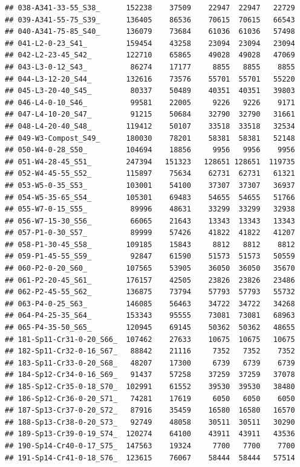 \documentclass[]{article}
\begin{document}
\begin{verbatim}
## 038-A341-33-55_S38_      152238    37509    22947  22947   22729
## 039-A341-55-75_S39_      136405    86536    70615  70615   66543
## 040-A341-75-85_S40_      136079    73684    61036  61036   57498
## 041-L2-0-23_S41_         159454    43258    23094  23094   23094
## 042-L2-23-45_S42_        122710    65865    49028  49028   47069
## 043-L3-0-12_S43_          86274    17177     8855   8855    8855
## 044-L3-12-20_S44_        132616    73576    55701  55701   55220
## 045-L3-20-40_S45_         80337    50489    40351  40351   39803
## 046-L4-0-10_S46_          99581    22005     9226   9226    9171
## 047-L4-10-20_S47_         91215    50684    32790  32790   31661
## 048-L4-20-40_S48_        119412    50107    33518  33518   32534
## 049-W3-Compost_S49_      180030    78201    58381  58381   52148
## 050-W4-0-28_S50_         104694    18856     9956   9956    9956
## 051-W4-28-45_S51_        247394   151323   128651 128651  119735
## 052-W4-45-55_S52_        115897    75634    62731  62731   61321
## 053-W5-0-35_S53_         103001    54100    37307  37307   36937
## 054-W5-35-65_S54_        105301    69483    54655  54655   51766
## 055-W7-0-15_S55_          89996    48631    33299  33299   32938
## 056-W7-15-30_S56_         66065    21643    13343  13343   13343
## 057-P1-0-30_S57_          89999    57426    41822  41822   41207
## 058-P1-30-45_S58_        109185    15843     8812   8812    8812
## 059-P1-45-55_S59_         92847    61590    51573  51573   50559
## 060-P2-0-20_S60_         107565    53905    36050  36050   35670
## 061-P2-20-45_S61_        176157    42505    23826  23826   23486
## 062-P2-45-55_S62_        136875    73794    57793  57793   55732
## 063-P4-0-25_S63_         146085    56463    34722  34722   34268
## 064-P4-25-35_S64_        153343    95555    73081  73081   68963
## 065-P4-35-50_S65_        120945    69145    50362  50362   48655
## 181-Sp11-Cr31-0-20_S66_  107462    27633    10675  10675   10675
## 182-Sp11-Cr32-0-16_S67_   88842    21116     7352   7352    7352
## 183-Sp11-Cr33-0-20_S68_   48207    17300     6739   6739    6739
## 184-Sp12-Cr34-0-16_S69_   91437    57258    37259  37259   37078
## 185-Sp12-Cr35-0-18_S70_  102991    61552    39530  39530   38480
## 186-Sp12-Cr36-0-20_S71_   74281    17619     6050   6050    6050
## 187-Sp13-Cr37-0-20_S72_   87916    35459    16580  16580   16570
## 188-Sp13-Cr38-0-20_S73_   92749    48058    30511  30511   30290
## 189-Sp13-Cr39-0-19_S74_  120274    64100    43911  43911   43536
## 190-Sp14-Cr40-0-17_S75_  147563    19324     7700   7700    7700
## 191-Sp14-Cr41-0-18_S76_  123615    76067    58444  58444   57514

\end{verbatim}
\end{document}
